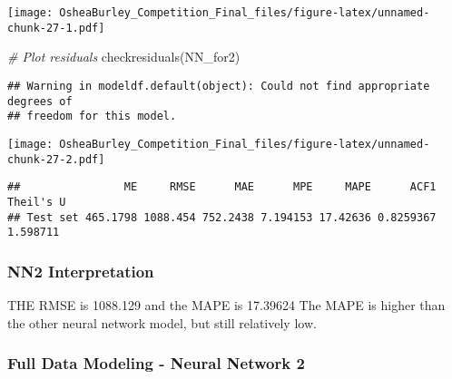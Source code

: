 \documentclass[
]{article}
\newenvironment{Shaded}{\begin{snugshade}}{\end{snugshade}}
\newcommand{\CommentTok}[1]{\textcolor[rgb]{0.56,0.35,0.01}{\textit{#1}}}
\newcommand{\FunctionTok}[1]{\textcolor[rgb]{0.00,0.00,0.00}{#1}}
\newcommand{\NormalTok}[1]{#1}
\newcommand{\OtherTok}[1]{\textcolor[rgb]{0.56,0.35,0.01}{#1}}
\newcommand{\SpecialCharTok}[1]{\textcolor[rgb]{0.00,0.00,0.00}{#1}}
\begin{document}
\texttt{[image: OsheaBurley\_Competition\_Final\_files/figure-latex/unnamed-chunk-27-1.pdf]}

\begin{Shaded}
\begin{Highlighting}[]
\CommentTok{\# Plot residuals}
\FunctionTok{checkresiduals}\NormalTok{(NN\_for2)}
\end{Highlighting}
\end{Shaded}

\begin{verbatim}
## Warning in modeldf.default(object): Could not find appropriate degrees of
## freedom for this model.
\end{verbatim}

\texttt{[image: OsheaBurley\_Competition\_Final\_files/figure-latex/unnamed-chunk-27-2.pdf]}

\begin{Shaded}
\end{Shaded}

\begin{verbatim}
##                ME     RMSE      MAE      MPE     MAPE      ACF1 Theil's U
## Test set 465.1798 1088.454 752.2438 7.194153 17.42636 0.8259367  1.598711
\end{verbatim}

\begin{Shaded}
\end{Shaded}

\hypertarget{nn2-interpretation}{%
\subsubsection{NN2 Interpretation}\label{nn2-interpretation}}

THE RMSE is 1088.129 and the MAPE is 17.39624 The MAPE is higher than
the other neural network model, but still relatively low.

\hypertarget{full-data-modeling---neural-network-2}{%
\subsubsection{Full Data Modeling - Neural Network
2}\label{full-data-modeling---neural-network-2}}
\end{document}
